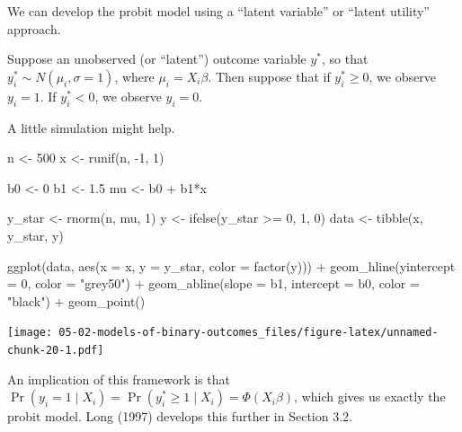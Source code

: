 \documentclass[
]{book}
\newenvironment{Shaded}{\begin{snugshade}}{\end{snugshade}}
\newcommand{\AttributeTok}[1]{\textcolor[rgb]{0.77,0.63,0.00}{#1}}
\newcommand{\DecValTok}[1]{\textcolor[rgb]{0.00,0.00,0.81}{#1}}
\newcommand{\FloatTok}[1]{\textcolor[rgb]{0.00,0.00,0.81}{#1}}
\newcommand{\FunctionTok}[1]{\textcolor[rgb]{0.00,0.00,0.00}{#1}}
\newcommand{\NormalTok}[1]{#1}
\newcommand{\OtherTok}[1]{\textcolor[rgb]{0.56,0.35,0.01}{#1}}
\newcommand{\SpecialCharTok}[1]{\textcolor[rgb]{0.00,0.00,0.00}{#1}}
\newcommand{\StringTok}[1]{\textcolor[rgb]{0.31,0.60,0.02}{#1}}
\begin{document}
We can develop the probit model using a ``latent variable'' or ``latent utility'' approach.

Suppose an unobserved (or ``latent'') outcome variable \(y^*\), so that \(y^*_i \sim N(\mu_i, \sigma = 1)\), where \(\mu_i = X_i\beta\). Then suppose that if \(y^*_i \geq 0\), we observe \(y_i = 1\). If \(y^*_i < 0\), we observe \(y_i = 0\).

A little simulation might help.

\begin{Shaded}
\begin{Highlighting}[]
\NormalTok{n }\OtherTok{\textless{}{-}} \DecValTok{500}
\NormalTok{x }\OtherTok{\textless{}{-}} \FunctionTok{runif}\NormalTok{(n, }\SpecialCharTok{{-}}\DecValTok{1}\NormalTok{, }\DecValTok{1}\NormalTok{)}

\NormalTok{b0 }\OtherTok{\textless{}{-}} \DecValTok{0}
\NormalTok{b1 }\OtherTok{\textless{}{-}} \FloatTok{1.5}
\NormalTok{mu }\OtherTok{\textless{}{-}}\NormalTok{ b0 }\SpecialCharTok{+}\NormalTok{ b1}\SpecialCharTok{*}\NormalTok{x}

\NormalTok{y\_star }\OtherTok{\textless{}{-}} \FunctionTok{rnorm}\NormalTok{(n, mu, }\DecValTok{1}\NormalTok{)}
\NormalTok{y }\OtherTok{\textless{}{-}} \FunctionTok{ifelse}\NormalTok{(y\_star }\SpecialCharTok{\textgreater{}=} \DecValTok{0}\NormalTok{, }\DecValTok{1}\NormalTok{, }\DecValTok{0}\NormalTok{)}
\NormalTok{data }\OtherTok{\textless{}{-}} \FunctionTok{tibble}\NormalTok{(x, y\_star, y)}

\FunctionTok{ggplot}\NormalTok{(data, }\FunctionTok{aes}\NormalTok{(}\AttributeTok{x =}\NormalTok{ x, }\AttributeTok{y =}\NormalTok{ y\_star, }\AttributeTok{color =} \FunctionTok{factor}\NormalTok{(y))) }\SpecialCharTok{+} 
  \FunctionTok{geom\_hline}\NormalTok{(}\AttributeTok{yintercept =} \DecValTok{0}\NormalTok{, }\AttributeTok{color =} \StringTok{"grey50"}\NormalTok{) }\SpecialCharTok{+}
  \FunctionTok{geom\_abline}\NormalTok{(}\AttributeTok{slope =}\NormalTok{ b1, }\AttributeTok{intercept =}\NormalTok{ b0, }\AttributeTok{color =} \StringTok{"black"}\NormalTok{) }\SpecialCharTok{+} 
  \FunctionTok{geom\_point}\NormalTok{() }
\end{Highlighting}
\end{Shaded}

\texttt{[image: 05-02-models-of-binary-outcomes\_files/figure-latex/unnamed-chunk-20-1.pdf]}

An implication of this framework is that \(\Pr(y_i = 1 \mid X_i) = \Pr(y^*_i \geq 1 \mid X_i) = \Phi(X_i\beta)\), which gives us exactly the probit model. Long (1997) develops this further in Section 3.2.
\end{document}
